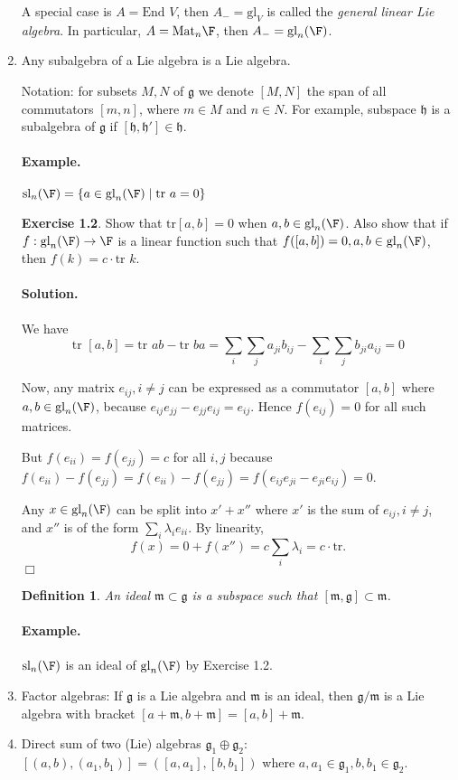 \documentclass[11pt]{article}
\newcommand{\sll}{\mbox{sl}}
\newcommand{\gl}{\mbox{gl}}
\newcommand{\tr}{\mbox{tr\ }}
\newcommand{\Mat}{\mbox{Mat}}
\newcommand{\End}{\mbox{End\ }}
\newcommand{\g}{\mathfrak{g}}
\newcommand{\h}{\mathfrak{h}}
\newcommand{\m}{\mathfrak{m}}
\newcommand{\sk}{\vspace*{1em}}
\newtheorem{defn}{Definition}
\begin{document}
\begin{enumerate}
A special case is $A = \End V$, then $A_- = \gl_V$ is called the 
\emph{general linear Lie algebra}.  In particular, $A = \Mat_n \F$, then
$A_- = \gl_n(\F)$.

\item Any subalgebra of a Lie algebra is a Lie algebra.

Notation: for subsets $M, N$ of $\g$ we denote $[M,N]$ the span of all
commutators $[m, n]$, where $m \in M$ and $n \in N$.  For example,
subspace $\h$ is a subalgebra of $\g$ if $[\h, \h'] \in \h$.

\paragraph{Example.} $\sll_n(\F) = \{ a \in \gl_n(\F) \mid \tr a = 0 \}$

\sk\noindent
{\bf Exercise 1.2}. Show that $\mbox{tr} [a,b] = 0$ when $a, b \in
\gl_n(\F)$.  Also show that if $f:\gl_n(\F) \rightarrow \F$ is a
linear function such that $f([a, b]) = 0, a, b \in \gl_n(\F)$, then
$f(k) = c \cdot \tr k$.

\paragraph{Solution.} We have
\[ \tr [a, b] = \tr ab - \tr ba = \sum_i \sum_j a_{ji} b_{ij} - \sum_i \sum_j b_{ji} a_{ij} = 0 \]

Now, any matrix $e_{ij}, i \neq j$ can be expressed as
a commutator $[a,b]$ where $a, b \in \gl_n(\F)$, because $e_{ij}e_{jj} - e_{jj}e_{ij}
= e_{ij}$.  Hence $f(e_{ij}) = 0$ for all such matrices.  

But $f(e_{ii}) = f(e_{jj}) = c$ for all $i, j$ because
$f(e_{ii})-f(e_{jj}) = f(e_{ii}) - f(e_{jj}) = 
f(e_{ij}e_{ji} - e_{ji}e_{ij}) = 0$.

Any $x \in \gl_n(\F)$ can be split into $x' + x''$ where
$x'$ is the sum of $e_{ij}, i \neq j$, 
and $x''$ is of the form $\sum_i \lambda_i e_{ii}$.  By linearity,
\[f(x) = 0 + f(x'') = c \sum_i \lambda_i = c \cdot \mbox{tr}.\]
$\Box$

\begin{defn}
An \emph{ideal} $\m \subset \g$ is a subspace such that $[\m, \g] \subset \m$.
\end{defn}

\paragraph{Example.} $\sll_n(\F)$ is an ideal of $\gl_n(\F)$ by Exercise 1.2.

\item Factor algebras: If $\g$ is a Lie algebra and $\m$ is an ideal,
then $\g / \m$ is a Lie algebra with bracket $[a+\m, b+\m] = [a, b]+\m$.

\item Direct sum of two (Lie) algebras $\g_1 \oplus \g_2$: $[(a, b), (a_1, b_1)] = ([a, a_1], [b, b_1])$ where $a, a_1 \in \g_1, b, b_1 \in \g_2$.
\end{enumerate}
\end{document}
